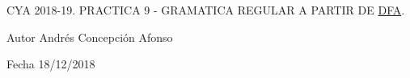 C\+YA 2018-\/19. P\+R\+A\+C\+T\+I\+CA 9 -\/ G\+R\+A\+M\+A\+T\+I\+CA R\+E\+G\+U\+L\+AR A P\+A\+R\+T\+IR DE \mbox{\hyperlink{class_d_f_a}{D\+FA}}.

\begin{DoxyAuthor}{Autor}
Andrés Concepción Afonso 
\end{DoxyAuthor}
\begin{DoxyDate}{Fecha}
18/12/2018 
\end{DoxyDate}
